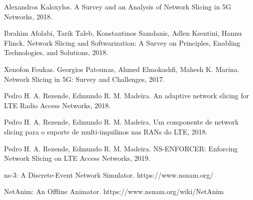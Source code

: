 \documentclass[12pt, a4paper]{article}
\begin{document}
\begin{thebibliography}{9}

Alexandros Kaloxylos. A Survey and an Analysis of Network Slicing in 5G Networks, 2018.

Ibrahim Afolabi, Tarik Taleb, Konstantinos Samdanis, Adlen Ksentini, Hannu Flinck. Network Slicing and Softwarization: 
A Survey on Principles, Enabling Technologies, and Solutions, 2018.

Xenofon Foukas. Georgios Patounas, Ahmed Elmokashfi, Mahesh K. Marina. Network Slicing in 5G: Survey and Challenges, 2017.

Pedro H. A. Rezende, Edmundo R. M. Madeira. An adaptive network slicing for LTE Radio Access Networks, 2018.

Pedro H. A. Rezende, Edmundo R. M. Madeira. Um componente de network slicing para o suporte de multi-inquilinos nas RANs do LTE, 2018.

Pedro H. A. Rezende, Edmundo R. M. Madeira. NS-ENFORCER: Enforcing Network Slicing on LTE Access Networks, 2019.

ns-3: A Discrete-Event Network Simulator. https://www.nsnam.org/

NetAnim: An Offline Animator. https://www.nsnam.org/wiki/NetAnim

\end{thebibliography}
\end{document}
